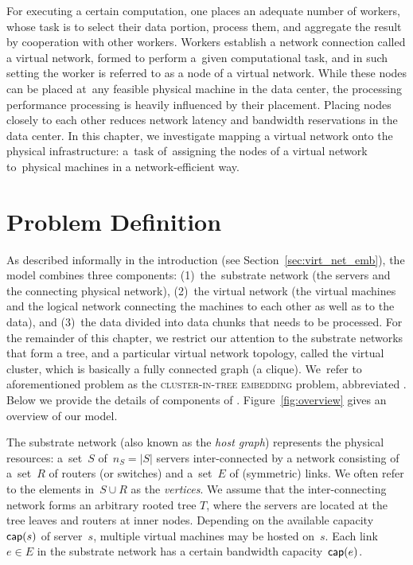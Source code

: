 
For executing a certain computation, one places an adequate number of workers, whose task is to select their data portion, process them, and aggregate the result by cooperation with other workers.
Workers establish a network connection called a virtual network, formed to perform a~given computational task, and in such setting the worker is referred to as a node of a virtual network.
While these nodes can be placed at~any feasible physical machine in the data center, the processing performance processing is heavily influenced by their placement.
Placing nodes closely to each other reduces network latency and bandwidth reservations in the data center.
In this chapter, we investigate mapping a virtual network onto the physical infrastructure: a~task of~assigning the nodes of a virtual network to~physical machines in a network-efficient way.

\section{Problem Definition}\label{sec:model}

As described informally in the introduction (see Section~\ref{sec:virt_net_emb}), the model combines three components: (1)~the~substrate network (the servers
and the connecting physical network),
(2)~the virtual network (the virtual machines and the logical network connecting the machines to each other
as well as to the data), and (3)~the data divided into data chunks that needs to be processed.
For the remainder of this chapter, we restrict our attention to the substrate networks that form a tree, and a particular virtual network topology, called the virtual cluster, which is basically a fully connected graph (a clique).
We~refer to aforementioned problem as the \textsc{cluster-in-tree embedding} problem, abbreviated \CTE.
Below we provide the details of components of \CTE. Figure~\ref{fig:overview} gives an overview of our model.


 The substrate network (also known as the \emph{host graph}) represents the physical resources:
a~set~$S$ of~$n_S=|S|$ servers inter-connected by a network consisting of a~set~$R$ of routers (or switches)
and a~set~$E$ of (symmetric) links. We often refer to the elements in~$S\cup R$
as the \emph{vertices}. We assume that the inter-connecting network forms an arbitrary rooted tree $T$,
where the servers are located at the tree leaves and routers at inner nodes.
Depending on the available capacity~$\textsf{cap}(s)$ of server~$s$, multiple virtual machines may be hosted on~$s$.
Each link~$e\in E$ in the substrate network has a certain bandwidth capacity~$\textsf{cap}(e)$.

